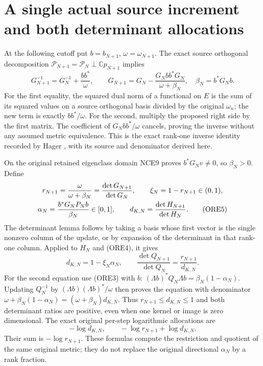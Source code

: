 \documentclass[11pt]{article}
\newcommand{\C}{\mathbb C}
\begin{document}
\section{A single actual source increment and both determinant allocations}
At the following cutoff put $b=b_{N+1}$, $\omega=\omega_{N+1}$.
The exact source orthogonal decomposition
$\mathcal P_{N+1}=\mathcal P_N\mathbin{\perp}\C p_{N+1}$ implies
\begin{equation}\tag{ORE4}
 G_{N+1}^{-1}=G_N^{-1}+\frac{bb^*}{\omega},\qquad
 G_{N+1}=G_N-\frac{G_Nbb^*G_N}{\omega+\beta_N},
 \quad\beta_N=b^*G_Nb.
\end{equation}
For the first equality, the squared dual norm of a functional on $E$
is the sum of its squared values on a source orthogonal basis divided
by the original $\omega_n$; the new term is exactly $bb^*/\omega$.
For the second, multiply the proposed right side by the first matrix.
The coefficient of $G_Nbb^*/\omega$ cancels, proving the inverse
without any assumed metric equivalence. This is the exact rank-one
inverse identity recorded by Hager \cite[p.~221, equation (2)]{Hager},
with its source and denominator derived here.

On the original retained eigenclass domain NCE9 proves
$b^*G_Nv\ne0$, so $\beta_N>0$. Define
\begin{gather}
 r_{N+1}=\frac{\omega}{\omega+\beta_N}
        =\frac{\det G_{N+1}}{\det G_N},\qquad
 \xi_N=1-r_{N+1}\in(0,1),\notag\\
 \alpha_N=\frac{b^*G_NP_Nb}{\beta_N}\in[0,1],\qquad
 d_{K,N}=\frac{\det H_{N+1}}{\det H_N}.                \tag{ORE5}
\end{gather}
The determinant lemma follows by taking a basis whose first vector is
the single nonzero column of the update, or by expansion of the
determinant in that rank-one column. Applied to $H_N$ and (ORE4), it gives
\begin{equation}\tag{ORE6}
 \boxed{d_{K,N}=1-\xi_N\alpha_N,\qquad
 \frac{\det Q_{N+1}}{\det Q_N}=
       \frac{r_{N+1}}{d_{K,N}}.}
\end{equation}
For the second equation use (ORE3) with $b$:
$(\Lambda b)^*Q_N\Lambda b=\beta_N(1-\alpha_N)$.
Updating $Q_N^{-1}$ by $(\Lambda b)(\Lambda b)^*/\omega$
then proves the equation with denominator
$\omega+\beta_N(1-\alpha_N)=(\omega+\beta_N)d_{K,N}$.
Thus $r_{N+1}\le d_{K,N}\le1$ and both determinant ratios are
positive, even when one kernel or image is zero dimensional.
The exact original per-step logarithmic allocations are
\begin{equation}\tag{ORE7}
 -\log d_{K,N},\qquad
 -\log r_{N+1}+\log d_{K,N}.
\end{equation}
Their sum is $-\log r_{N+1}$. These formulas compute the
restriction and quotient of the same original metric; they do not
replace the original directional $\alpha_N$ by a rank fraction.
\end{document}
